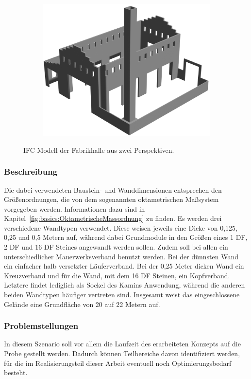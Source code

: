 \begin{figure}[hb!]
\begin{subfigure}[b]{0.49\columnwidth}
    \includegraphics[width=\columnwidth]{fig/scenario3_render_ifc2.png}
  \end{subfigure}
  \caption{IFC Modell der Fabrikhalle aus zwei Perspektiven.}\label{fig:scenarios:Scenario3 Gebaeudeplan}
\end{figure}

\subsubsection*{Beschreibung}
Die dabei verwendeten Baustein- und Wanddimensionen entsprechen den Größenordnungen, die von dem sogenannten oktametrischen Maßsystem vorgegeben werden.
Informationen dazu sind in Kapitel~\ref{fig:basics:OktametrischeMassordnung} zu finden.
Es werden drei verschiedene Wandtypen verwendet.
Diese weisen jeweils eine Dicke von 0,125, 0,25 und 0,5 Metern auf, während dabei Grundmodule in den Größen eines 1 DF, 2 DF und 16 DF Steines angewandt werden sollen.
Zudem soll bei allen ein unterschiedlicher Mauerwerksverband benutzt werden.
Bei der dünnsten Wand ein einfacher halb versetzter Läuferverband.
Bei der 0,25 Meter dicken Wand ein Kreuzverband und für die Wand, mit dem 16 DF Steinen, ein Kopfverband.
Letztere findet lediglich als Sockel des Kamins Anwendung, während die anderen beiden Wandtypen häufiger vertreten sind.
Insgesamt weist das eingeschlossene Gelände eine Grundfläche von 20 auf 22 Metern auf.

\subsubsection*{Problemstellungen}
In diesem Szenario soll vor allem die Laufzeit des erarbeiteten Konzepts auf die Probe gestellt werden.
Dadurch können Teilbereiche davon identifiziert werden, für die im Realisierungsteil dieser Arbeit eventuell noch Optimierungsbedarf besteht.

